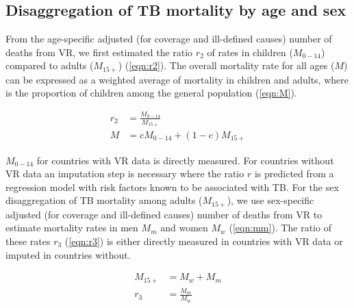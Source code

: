 \subsection{Disaggregation of TB mortality by age and sex}


From the age-specific adjusted (for coverage and ill-defined causes) number of deaths from VR, we first estimated the ratio $r_2$ of rates in children ($M_{0-14}$) compared to adults ($M_{15+}$) (\ref{eqn:r2}). The overall mortality rate for all ages ($M$) can be expressed as a weighted average of mortality in children and adults, where  is the proportion of children among the general population (\ref{eqn:M}).

\begin{equation}
\begin{align}
r_2 &= \frac{M_{0-14}}{M_{15+}} \label{eqn:r2} \\
M &= c M_{0-14} + (1 - c) M_{15+} \label{eqn:M}
\end{align}
\end{equation}

$M_{0-14}$ for countries with VR data is directly measured. For countries without VR data an imputation step is necessary where the ratio $r$ is predicted from a regression model with risk factors known to be associated with TB. For the sex disaggregation of TB mortality among adults ($M_{15+}$), we use sex-specific adjusted (for coverage and ill-defined causes) number of deaths from VR to estimate mortality rates in men $M_m$  and women $M_w$ (\ref{eqn:mm}). The ratio of these rates $r_3$ (\ref{eqn:r3}) is either directly measured in countries with VR data or imputed in countries without.

\begin{equation}
\begin{align}
M_{15+} &= M_w + M_m \label{eqn:mm} \\
r_3 &= \frac{M_m}{M_w} \label{eqn:r3}
\end{align}
\end{equation}


